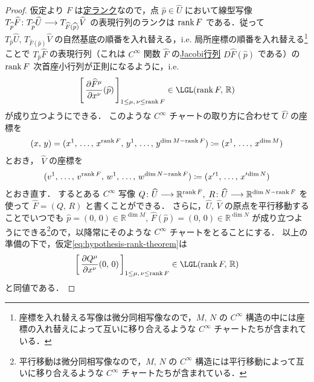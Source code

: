 \documentclass[TQFT_main]{subfiles}
\begin{document}
\begin{proof}
    仮定より $F$ は\hyperref[def:rank-smooth]{定ランク}なので，点 $\widehat{p} \in \widehat{U}$ において線型写像 $T_{\widehat{p}} \widehat{F} \colon T_{\widehat{p}} \widehat{U} \longrightarrow T_{\widehat{F} (\widehat{p})} \widehat{V}$ の表現行列のランクは $\rank F$ である．従って $T_{\widehat{p}} \widehat{U},\, T_{\widehat{F} (\widehat{p})} \widehat{V}$ の自然基底の順番を入れ替える，i.e. 局所座標の順番を入れ替える\footnote{座標を入れ替える写像は微分同相写像なので，$M,\, N$ の $C^\infty$ 構造の中には座標の入れ替えによって互いに移り合えるような $C^\infty$ チャートたちが含まれている．}ことで $T_{\widehat{p}} \widehat{F}$ の表現行列（これは $C^\infty$ 関数 $\widehat{F}$ の\hyperref[thm:inverse-function-Rn]{Jacobi行列} $D \widehat{F} (\widehat{p})$ である）の $\rank F$ 次首座小行列が正則になるように，i.e.
    \begin{align}
        \label{eq:hypothesis-rank-theorem}
        \left[ \, \pdv{\widehat{F}^\mu}{x^\nu}()(\widehat{p}) \, \right]_{1 \le \mu,\, \nu \le \rank F} \in \LGL(\rank F,\, \mathbb{R})
    \end{align}
    が成り立つようにできる．
    このような $C^\infty$ チャートの取り方に合わせて 
    $\widehat{U}$ の座標を 
    \begin{align}
        (x,\, y) = (x^1,\, \dots,\, x^{\rank F},\, y^1,\, \dots,\, y^{\dim M - \rank F}) \coloneqq (x^1,\, \dots,\, x^{\dim M})
    \end{align}
    とおき，
    $\widehat{V}$ の座標を 
    \begin{align}
        (v^1,\, \dots,\, v^{\rank F},\, w^1,\, \dots,\, w^{\dim N - \rank F}) \coloneqq (x'{}^1,\, \dots,\, x'{}^{\dim N})
    \end{align}
    とおき直す．
    するとある $C^\infty$ 写像
    $Q \colon \widehat{U} \longrightarrow \mathbb{R}^{\rank F},\; R \colon \widehat{U} \longrightarrow \mathbb{R}^{\dim N - \rank F}$ を使って $\widehat{F} = (Q,\, R)$ と書くことができる．
    さらに，$\widehat{U},\, \widehat{V}$ の原点を平行移動することでいつでも $\widehat{p} = (0,\, 0) \in \mathbb{R}^{\dim M},\, \widehat{F}(\widehat{p}) = (0,\, 0) \in \mathbb{R}^{\dim N}$ が成り立つようにできる\footnote{平行移動は微分同相写像なので，$M,\, N$ の $C^\infty$ 構造には平行移動によって互いに移り合えるような $C^\infty$ チャートたちが含まれている．}ので，以降常にそのような $C^\infty$ チャートをとることにする．
    以上の準備の下で，仮定\eqref{eq:hypothesis-rank-theorem}は
    \begin{align}
        \label{eq:hypothesis-rank-theorem-1}
        \left[ \, \pdv{Q^\mu}{x^\nu}()(0,\, 0) \,\right]_{1 \le \mu,\, \nu \le \rank F} \in \LGL(\rank F,\, \mathbb{R})
    \end{align}
    と同値である．
    

\end{proof}
\end{document}
